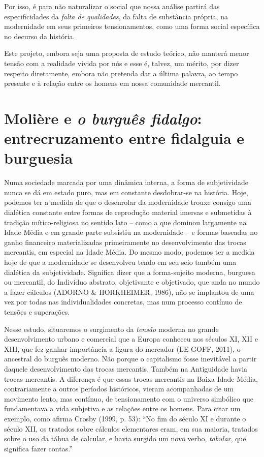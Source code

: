 Por isso, é para não naturalizar o social que nossa análise partirá das
especificidades da \emph{falta de qualidades}, da falta de substância
própria, na modernidade em seus primeiros tensionamentos, como uma forma
social específica no decurso da história.

Este projeto, embora seja uma proposta de estudo teórico, não manterá
menor tensão com a realidade vivida por nós e esse é, talvez, um mérito,
por dizer respeito diretamente, embora não pretenda dar a última
palavra, ao tempo presente e à relação entre os homens em nossa
comunidade mercantil.

\chapter{Molière e \emph{o burguês fidalgo}: entrecruzamento entre fidalguia e burguesia}

Numa sociedade marcada por uma dinâmica interna, a forma de
subjetividade nunca se dá em estado puro, mas em constante desdobrar-se
na história. Hoje, podemos ter a medida de que o desenrolar da
modernidade trouxe consigo uma dialética constante entre formas de
reprodução material imersas e submetidas à tradição mítico-religiosa no
sentido lato -- como a que dominou largamente na Idade Média e em grande
parte subsistiu na modernidade -- e formas baseadas no ganho financeiro
materializadas primeiramente no desenvolvimento das trocas mercantis, em
especial na Idade Média. Do mesmo modo, podemos ter a medida hoje de que
a modernidade se desenvolveu tendo em seu seio também uma dialética da
subjetividade. Significa dizer que a forma-sujeito moderna, burguesa ou
mercantil, do Indivíduo abstrato, objetivante e objetivado, que anda no
mundo a fazer cálculos (ADORNO \& HORKHEIMER, 1986), não se implantou de
uma vez por todas nas individualidades concretas, mas num processo
contínuo de tensões e superações.

Nesse estudo, situaremos o surgimento da \emph{tensão} moderna no grande
desenvolvimento urbano e comercial que a Europa conheceu nos séculos XI,
XII e XIII, que fez ganhar importância a figura do mercador (LE GOFF,
2011), o ancestral do burguês moderno. Não porque o capitalismo fosse
inevitável a partir daquele desenvolvimento das trocas mercantis. Também
na Antiguidade havia trocas mercantis. A diferença é que essas trocas
mercantis na Baixa Idade Média, contrariamente a outros períodos
históricos, vieram acompanhadas de um movimento lento, mas contínuo, de
tensionamento com o universo simbólico que fundamentava a vida subjetiva
e as relações entre os homens. Para citar um exemplo, como afirma Crosby
(1999, p. 53): ``No fim do século XI e durante o século XII, os tratados
sobre cálculos elementares eram, em sua maioria, tratados sobre o uso da
tábua de calcular, e havia surgido um novo verbo, \emph{tabular}, que
significa fazer contas.''

